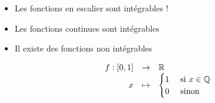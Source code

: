 \begin{frame}

\begin{exemple}
\begin{itemize}
\item Les fonctions en escalier sont intégrables ! 

\pause

\item Les fonctions continues sont intégrables 

\pause

\item Il existe des fonctions non intégrables 

\pause

\begin{minipage}{0.39\textwidth}
$$\begin{array}{rcl} 
f : [0,1] & \to & \mathbb{R}    \\
 x & \mapsto & \begin{cases}
               1 & \text{ si } x \in \mathbb{Q} \\
               0 & \text{ sinon }    
             \end{cases}
  \end{array}$$  
\end{minipage}
\pause
\begin{minipage}{0.39\textwidth}
\end{minipage}

\end{itemize}
\end{exemple}
\end{frame}


